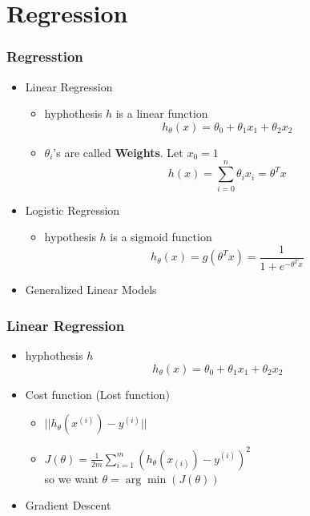 \documentclass{beamer}
\begin{document}
\section{Regression}
\begin{frame}
\frametitle{Regresstion}
\begin{itemize}
	\item Linear Regression
	\begin{itemize}
		\item hyphothesis $h$ is a linear function
	\begin{equation}
		h_{\theta}(x) =\theta _{0} + \theta _{1}x_1+ \theta _{2}x_2
	\end{equation}
	\item $\theta _i$'s are called {\bf Weights}. Let $x_0 = 1$
	\begin{equation}
		h(x)=\sum_{i=0}^{n}\theta _{i}x_{i} = \theta ^{T}x
	\end{equation}
	\end{itemize}
	\item Logistic Regression
	\begin{itemize}
	\item hypothesis $h$ is a sigmoid function
	\begin{equation}
		h_{\theta}(x) = g(\theta ^{T}x) =\frac{1}{1 + e^{-\theta ^{T}x}}
	\end{equation}
	\end{itemize}
	\item Generalized Linear Models
\end{itemize}
\end{frame}

\begin{frame}
\frametitle{Linear Regression}
\begin{itemize}
	\item hyphothesis $h$
	\begin{equation}
		h_{\theta}(x) =\theta _{0} + \theta _{1}x_1+ \theta _{2}x_2
	\end{equation}
	\item Cost function (Lost function)
	\begin{itemize}
		\item $||h_{\theta}(x^{(i)})-y^{(i)}||$
		\item $J(\theta)=\frac{1}{2m}\sum_{i=1}^{m}(h_{\theta}(x_{(i)})-y^{(i)})^2$\\so we want $\theta=\arg\min(J(\theta))$
	\end{itemize}
	\item Gradient Descent
\end{itemize}
\end{frame}
\end{document}
